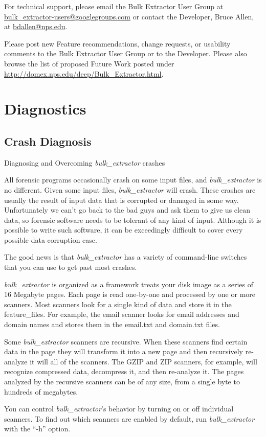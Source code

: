 \documentclass[10pt,twoside]{article}
\newcommand{\bulk}{\emph{bulk\_extractor}\xspace}
\begin{document}
For technical support, please email the Bulk Extractor User Group
at \href{mailto:bulk\_extractor-users@googlegroups.com}{bulk\_extractor-users@googlegroups.com}
or contact the Developer, Bruce Allen, at \href{mailto:bdallen@nps.edu}{bdallen@nps.edu}.

Please post new Feature recommendations, change requests,
or usability comments to the Bulk Extractor User Group or to the Developer.
Please also browse the list of proposed Future Work
posted under \url{http://domex.nps.edu/deep/Bulk\_Extractor.html}.

\section{Diagnostics}
\subsection{Crash Diagnosis}
Diagnosing and Overcoming \bulk crashes

All forensic programs occasionally crash on some input files, and \bulk is no different. Given some input files, \bulk will crash. These crashes are usually the result of input data that is corrupted or damaged in some way. Unfortunately we can’t go back to the bad guys and ask them to give us clean data, so forensic software needs to be tolerant of any kind of input. Although it is possible to write such software, it can be exceedingly difficult to cover every possible data corruption case.

The good news is that \bulk has a variety of command-line switches that you can use to get past most crashes.

\bulk is organized as a framework treats your disk image as a series of 16 Megabyte pages. Each page is read one-by-one and processed by one or more scanners. Most scanners look for a single kind of data and store it in the feature\_files. For example, the email scanner looks for email addresses and domain names and stores them in the email.txt and domain.txt files.

Some \bulk scanners are recursive. When these scanners find certain data in the page they will transform it into a new page and then recursively re-analyze it will all of the scanners. The GZIP and ZIP scanners, for example, will recognize compressed data, decompress it, and then re-analyze it. The pages analyzed by the recursive scanners can be of any size, from a single byte to hundreds of megabytes.

You can control \bulk’s behavior by turning on or off individual scanners. To find out which scanners are enabled by default, run \bulk with the “-h” option.
\end{document}
